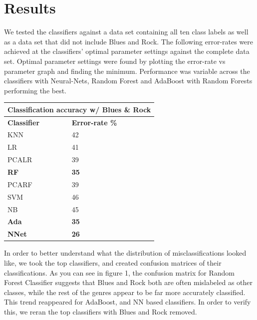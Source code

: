 \documentclass{article} %
\begin{document}
\section{Results}
We tested the classifiers against a data set containing all ten class labels as well as a data set that did not include Blues and Rock. The following error-rates were achieved at the classifiers' optimal parameter settings against the complete data set. Optimal parameter settings were found by plotting the error-rate vs parameter graph and finding the minimum.  Performance was variable across the classifiers with Neural-Nets, Random Forest and AdaBoost with Random Forests performing the best. \newline
\begin{center}
	\begin{tabular}{ |p{2cm}|p{2.3cm}|}
		\hline
		\multicolumn{2}{|c|}{\textbf{Classification accuracy w/ Blues \& Rock}} \\
		\hline
		\textbf{Classifier} & \textbf{Error-rate \%} \\
		\hline
		KNN & 42 \\
		LR & 41  \\
		PCALR & 39 \\
		\textbf{RF}    &  \textbf{35} \\
		PCARF & 39 \\
		SVM & 46 \\
		NB & 45 \\
		\textbf{Ada} & \textbf{35} \\
		\textbf{NNet} & \textbf{26} \\
		\hline
	\end{tabular}
\end{center}
In order to better understand what the distribution of misclassifications looked like, we took the top classifiers, and created confusion matrices of their classifications. As you can see in figure 1, the confusion matrix for Random Forest Classifier suggests that Blues and Rock both are often mislabeled as other classes, while the rest of the genres appear to be far more accurately classified. This trend reappeared for AdaBoost, and NN based classifiers. In order to verify this, we reran the top classifiers with Blues and Rock removed.
\end{document}
